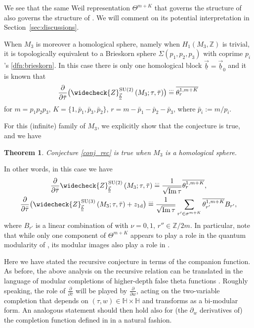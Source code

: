 \documentclass[10pt,a4paper]{amsart}
\newcommand{\HH}{\mathbb{H}}
\newcommand{\ZZ}{\mathbb{Z}}
\newcommand{\Zchlong}[3]{\ensuremath{\widecheck{Z}^{#1}_{#2}\left(#3;\tau,\bar{\tau}\right)}}
\def\bv{{\vec{\underline{b}}}}
\newtheorem{thm}{Theorem}[section]
\theoremstyle{definition}
\numberwithin{equation}{section}
\begin{document}
We see that the same Weil representation $\Theta^{m+K}$ that governs the structure of  also governs the structure of . We will comment on its potential interpretation in Section~\ref{sec:discussions}.

When $M_3$ is moreover a homological sphere, namely when $H_1(M_3,\ZZ)$ is trivial, it is topologically equivalent to a Brieskorn sphere $\Sigma(p_1,p_2,p_3)$ with coprime $p_i$'s \eqref{dfn:brieskorn}. In this case there is only one homological block $\bv=\bv_0$ and it is known that \cite{cheng20193d}
 \[
 \frac{\partial}{\partial \bar \tau} \bigl(\Zchlong{{\rm SU}(2)}{\bv}{M_3}\bigr) \stackrel{\dots}{=} \overline{\theta_{r}^{1,m+K}}
 \]
for
$ m=p_1p_2p_3$, $K=\{1,\bar p_1,\bar p_3,\bar p_2\}$, $r=m-\bar p_1-\bar p_2-\bar p_3$,
where $\bar p_i:=m/p_i$.

For this (infinite) family of $M_3$, we explicitly show that the conjecture is true, and we have

\begin{thm}\label{thm:intro_brieskorn_recursive}
Conjecture {\rm \ref{conj_rec}} is true when $M_3$ is a homological sphere.
\end{thm}

In other words, in this case we have
\begin{gather}
 \frac{\partial}{\partial \bar \tau}\Zchlong{{\rm SU}(2)}{\bv}{M_3} \stackrel{\dots}{=} \frac{1}{\sqrt{\operatorname{Im} \tau} }\overline{\theta_{r}^{1,m+K}},\nonumber\\
 \frac{\partial}{\partial \bar \tau}
 \bigl( \Zchlong{{\rm SU}(3)}{\bv}{M_3} + z_{1\rm d} \bigr)
 \stackrel{\dots}{=} \frac{1}{\sqrt{\operatorname{Im} \tau} }\sum_{r' \in \sigma^{m+K}}
 \overline{ \theta^{1,m+K}_{r'}} B_{r' },\label{thm:recursive}
\end{gather}
where $B_{r' }$ is a linear combination of  with $\nu=0,1$, $r''\in \ZZ/2m$. In particular, note that while only one component of $\Theta^{m+K}$ appears to play a role in the quantum modularity of , its modular images also play a role in .

Here we have stated the recursive conjecture in terms of the companion function. As before, the above analysis on the recursive relation can be translated in the language of modular completions of higher-depth false theta functions \cite{Bringmann:2021dxg}. Roughly speaking, the role of $\frac{\partial}{\partial \bar\tau}$ will be played by $\frac{\partial}{\partial w}$, acting on the two-variable completion that depends on $(\tau,w)\in \HH\times \HH$ and transforms as a bi-modular form. An analogous statement should then hold also for (the $\partial_w$ derivatives of) the
 completion function defined in \cite{Bringmann:2021dxg} in a natural fashion.
\end{document}
